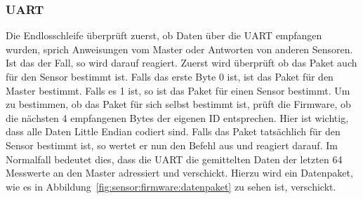 {\begin{a3pages}
{\begin{minipage}{135mm}
\subsubsection{UART}
\label{subs:UART}

Die Endlosschleife  \"uberpr\"uft zuerst, ob  Daten \"uber die  UART empfangen
wurden, sprich Anweisungen vom Master oder Antworten von anderen Sensoren. Ist
das der Fall, so wird darauf reagiert.  Zuerst wird \"uberpr\"uft ob das Paket
auch f\"ur den Sensor bestimmt ist. Falls das  erste Byte 0 ist, ist das Paket
f\"ur den Master bestimmt. Falls es 1 ist, so ist das Paket f\"ur einen Sensor
bestimmt. Um  zu bestimmen,  ob  das  Paket f\"ur  sich  selbst bestimmt  ist,
pr\"uft  die Firmware,  ob  die  n\"achsten 4  empfangenen  Bytes der  eigenen
ID  entsprechen. Hier  ist wichtig,  dass  alle  Daten Little  Endian  codiert
sind.  Falls das Paket tats\"achlich f\"ur  den Sensor bestimmt ist, so wertet
er  nun den  Befehl  aus  und reagiert  darauf. Im  Normalfall bedeutet  dies,
dass  die  UART  die  gemittelten  Daten  der  letzten  64  Messwerte  an  den
Master  adressiert  und verschickt. Hierzu  wird  ein  Datenpaket, wie  es  in
Abbildung~\ref{fig:sensor:firmware:datenpaket} zu sehen ist, verschickt.

\end{minipage}}
\hspace*{45mm}

\end{a3pages}}

